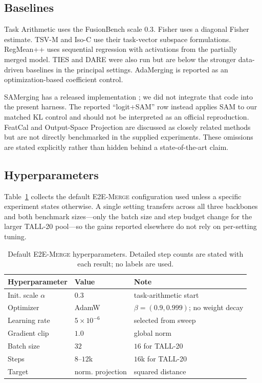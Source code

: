 \documentclass[letterpaper]{article} %
\newcommand{\method}{\textup{\textsc{E2E-Merge}}\xspace}
\theoremstyle{plain}
\theoremstyle{definition}
\begin{document}
\subsection{Baselines}
Task Arithmetic uses the FusionBench scale $0.3$.
Fisher uses a diagonal Fisher estimate.
TSV-M and Iso-C use their task-vector subspace formulations.
RegMean++ uses sequential regression with activations from the partially merged model.
TIES and DARE were also run but are below the stronger data-driven baselines in the principal settings.
AdaMerging is reported as an optimization-based coefficient control.

SAMerging has a released implementation \citep{samerging2025}; we did not integrate that code into the present harness.
The reported ``logit+SAM'' row instead applies SAM to our matched KL control and should not be interpreted as an official reproduction.
FeatCal and Output-Space Projection are discussed as closely related methods \citep{featcal2026,outputprojection2026} but are not directly benchmarked in the supplied experiments.
These omissions are stated explicitly rather than hidden behind a state-of-the-art claim.

\subsection{Hyperparameters}
Table~\ref{tab:hyperparameters} collects the default \method configuration used unless a specific experiment states otherwise.
A single setting transfers across all three backbones and both benchmark sizes---only the batch size and step budget change for the larger TALL-20 pool---so the gains reported elsewhere do not rely on per-setting tuning.

\begin{table}[tb]
\centering
{\small
\begin{tabular}{p{0.92in}p{0.72in}p{1.18in}}
\toprule
Hyperparameter & Value & Note \\
\midrule
Init. scale $\alpha$ & $0.3$ & task-arithmetic start \\
Optimizer & AdamW & $\beta=(0.9,0.999)$; no weight decay \\
Learning rate & $5\times10^{-6}$ & selected from sweep \\
Gradient clip & $1.0$ & global norm \\
Batch size & $32$ & $16$ for TALL-20 \\
Steps & $8$--$12$k & $16$k for TALL-20 \\
Target & norm. projection & squared distance \\
\bottomrule
\end{tabular}
}
\caption{Default \method hyperparameters. Detailed step counts are stated with each
result; no labels are used.}
\label{tab:hyperparameters}
\end{table}
\end{document}
